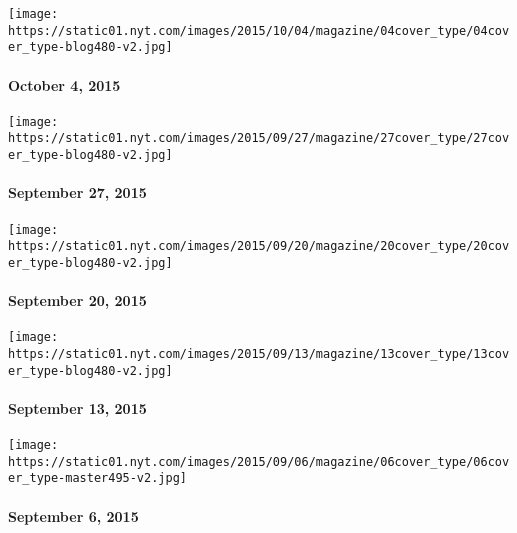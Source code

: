 \href{http://www.nytimes.com/indexes/2015/10/04/magazine/index.html}{}

\texttt{[image: https://static01.nyt.com/images/2015/10/04/magazine/04cover\_type/04cover\_type-blog480-v2.jpg]}

\hypertarget{october-4-2015}{%
\paragraph{October 4, 2015}\label{october-4-2015}}

\href{http://www.nytimes.com/indexes/2015/09/27/magazine/index.html}{}

\texttt{[image: https://static01.nyt.com/images/2015/09/27/magazine/27cover\_type/27cover\_type-blog480-v2.jpg]}

\hypertarget{september-27-2015}{%
\paragraph{September 27, 2015}\label{september-27-2015}}

\href{http://www.nytimes.com/indexes/2015/09/20/magazine/index.html}{}

\texttt{[image: https://static01.nyt.com/images/2015/09/20/magazine/20cover\_type/20cover\_type-blog480-v2.jpg]}

\hypertarget{september-20-2015}{%
\paragraph{September 20, 2015}\label{september-20-2015}}

\href{http://www.nytimes.com/indexes/2015/09/13/magazine/index.html}{}

\texttt{[image: https://static01.nyt.com/images/2015/09/13/magazine/13cover\_type/13cover\_type-blog480-v2.jpg]}

\hypertarget{september-13-2015}{%
\paragraph{September 13, 2015}\label{september-13-2015}}

\href{http://www.nytimes.com/indexes/2015/09/06/magazine/index.html}{}

\texttt{[image: https://static01.nyt.com/images/2015/09/06/magazine/06cover\_type/06cover\_type-master495-v2.jpg]}

\hypertarget{september-6-2015}{%
\paragraph{September 6, 2015}\label{september-6-2015}}


